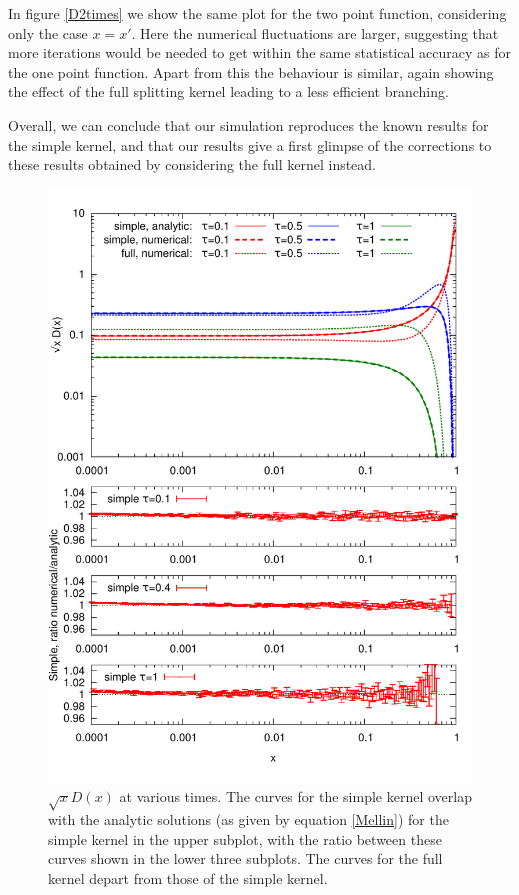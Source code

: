 \documentclass[a4paper,12pt]{article}
\numberwithin{equation}{section}
\begin{document}
In figure \ref{D2times} we show the same plot for the two point function, considering only the case $x=x'$. Here the numerical fluctuations are larger, suggesting that more iterations would be needed to get within the same statistical accuracy as for the one point function. Apart from this the behaviour is similar, again showing the effect of the full splitting kernel leading to a less efficient branching.

Overall, we can conclude that our simulation reproduces the known results for the simple kernel, and that our results give a first glimpse of the corrections to these results obtained by considering the full kernel instead. 







\begin{figure}
\centering
\includegraphics[width=0.9\linewidth]{times.pdf}
\vspace*{-20pt}
\caption{$\sqrt{x} D(x)$ at various times. The curves for the simple kernel overlap with the analytic solutions (as given by equation \eqref{Mellin}) for the simple kernel in the upper subplot, with the ratio between these curves shown in the lower three subplots. The curves for the full kernel depart from those of the simple kernel.}\label{Dtimes}
\end{figure}
\end{document}
